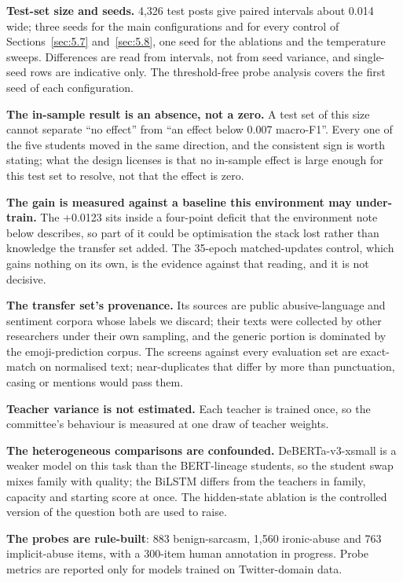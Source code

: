 \textbf{Test-set size and seeds.} 4,326 test posts give paired intervals about 0.014 wide; three
seeds for the main configurations and for every control of Sections~\ref{sec:5.7} and~\ref{sec:5.8},
one seed for the ablations and the temperature sweeps. Differences are read from intervals, not from
seed variance, and single-seed rows are indicative only. The threshold-free probe analysis covers
the first seed of each configuration.

\textbf{The in-sample result is an absence, not a zero.} A test set of this size cannot separate
``no effect'' from ``an effect below 0.007 macro-F1''. Every one of the five students moved in the
same direction, and the consistent sign is worth stating; what the design licenses is that no
in-sample effect is large enough for this test set to resolve, not that the effect is zero.

\textbf{The gain is measured against a baseline this environment may under-train.} The +0.0123 sits
inside a four-point deficit that the environment note below describes, so part of it could be
optimisation the stack lost rather than knowledge the transfer set added. The 35-epoch
matched-updates control, which gains nothing on its own, is the evidence against that reading, and
it is not decisive.

\textbf{The transfer set's provenance.} Its sources are public abusive-language and sentiment
corpora whose labels we discard; their texts were collected by other researchers under their own
sampling, and the generic portion is dominated by the emoji-prediction corpus. The screens against
every evaluation set are exact-match on normalised text; near-duplicates that differ by more than
punctuation, casing or mentions would pass them.

\textbf{Teacher variance is not estimated.} Each teacher is trained once, so the committee's
behaviour is measured at one draw of teacher weights.

\textbf{The heterogeneous comparisons are confounded.} DeBERTa-v3-xsmall is a weaker model on this
task than the BERT-lineage students, so the student swap mixes family with quality; the BiLSTM
differs from the teachers in family, capacity and starting score at once. The hidden-state ablation
is the controlled version of the question both are used to raise.

\textbf{The probes are rule-built}: 883 benign-sarcasm, 1,560 ironic-abuse and 763 implicit-abuse
items, with a 300-item human annotation in progress. Probe metrics are reported only for models
trained on Twitter-domain data.

